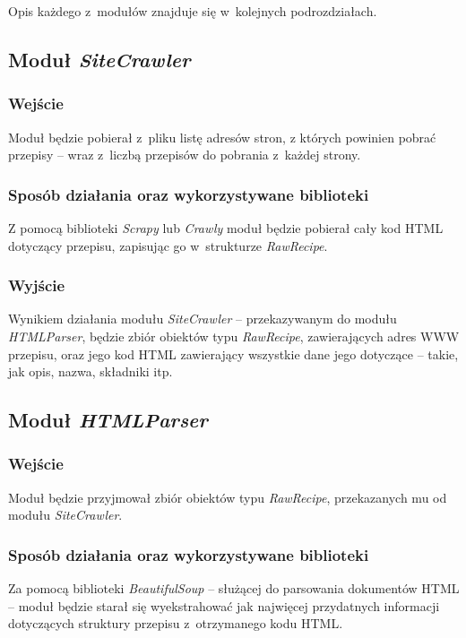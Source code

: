 \documentclass[11pt,a4paper]{article}
\begin{document}
Opis każdego z~modułów znajduje się w~kolejnych podrozdziałach.

\subsection{Moduł \textit{SiteCrawler}}
\subsubsection{Wejście}
Moduł będzie pobierał z~pliku listę adresów stron, z których powinien pobrać przepisy -- wraz z~liczbą przepisów do pobrania z~każdej strony.
\subsubsection{Sposób działania oraz wykorzystywane biblioteki}
Z pomocą biblioteki \textit{Scrapy} lub \textit{Crawly} moduł będzie pobierał cały kod HTML dotyczący przepisu, zapisując go w~strukturze \textit{RawRecipe}.
\subsubsection{Wyjście}
Wynikiem działania modułu \textit{SiteCrawler} -- przekazywanym do modułu \textit{HTMLParser}, będzie zbiór obiektów typu \textit{RawRecipe}, zawierających adres WWW przepisu, oraz jego kod HTML zawierający wszystkie dane jego dotyczące -- takie, jak opis, nazwa, składniki itp.

\subsection{Moduł \textit{HTMLParser}}
\subsubsection{Wejście}
Moduł będzie przyjmował zbiór obiektów typu \textit{RawRecipe}, przekazanych mu od modułu \textit{SiteCrawler}.
\subsubsection{Sposób działania oraz wykorzystywane biblioteki}
Za pomocą biblioteki \textit{BeautifulSoup} -- służącej do parsowania dokumentów HTML -- moduł będzie starał się wyekstrahować jak najwięcej przydatnych informacji dotyczących struktury przepisu z~otrzymanego kodu HTML.
\end{document}
